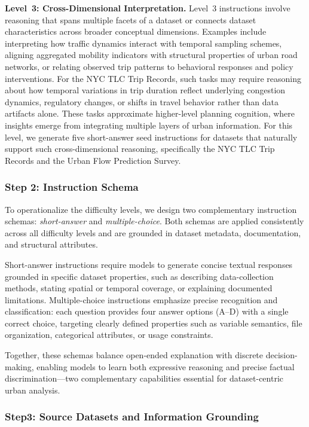 \documentclass[a4paper,fleqn]{cas-sc}
\begin{document}
\textbf{Level~3: Cross-Dimensional Interpretation.}
Level~3 instructions involve reasoning that spans multiple facets of a dataset or connects dataset characteristics across broader conceptual dimensions. Examples include interpreting how traffic dynamics interact with temporal sampling schemes, aligning aggregated mobility indicators with structural properties of urban road networks, or relating observed trip patterns to behavioral responses and policy interventions. For the NYC TLC Trip Records, such tasks may require reasoning about how temporal variations in trip duration reflect underlying congestion dynamics, regulatory changes, or shifts in travel behavior rather than data artifacts alone. These tasks approximate higher-level planning cognition, where insights emerge from integrating multiple layers of urban information. For this level, we generate five short-answer seed instructions for datasets that naturally support such cross-dimensional reasoning, specifically the NYC TLC Trip Records and the Urban Flow Prediction Survey.

\subsubsection{Step 2: Instruction Schema}

To operationalize the difficulty levels, we design two complementary instruction schemas: \emph{short-answer} and \emph{multiple-choice}. Both schemas are applied consistently across all difficulty levels and are grounded in dataset metadata, documentation, and structural attributes.

Short-answer instructions require models to generate concise textual responses grounded in specific dataset properties, such as describing data-collection methods, stating spatial or temporal coverage, or explaining documented limitations. Multiple-choice instructions emphasize precise recognition and classification: each question provides four answer options (A–D) with a single correct choice, targeting clearly defined properties such as variable semantics, file organization, categorical attributes, or usage constraints.

Together, these schemas balance open-ended explanation with discrete decision-making, enabling models to learn both expressive reasoning and precise factual discrimination—two complementary capabilities essential for dataset-centric urban analysis.

\subsubsection{Step3: Source Datasets and Information Grounding}
\end{document}
